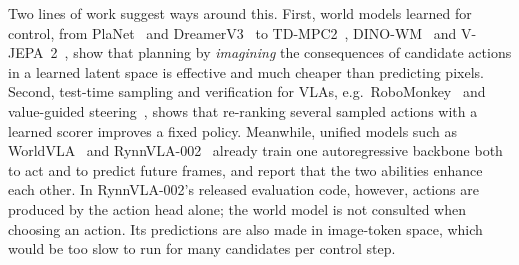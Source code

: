\documentclass[11pt]{article}
\begin{document}
Two lines of work suggest ways around this. First, world models learned for control, from PlaNet~\citep{hafner2018planet} and DreamerV3~\citep{hafner2023dreamerv3} to TD-MPC2~\citep{hansen2023tdmpc2}, DINO-WM~\citep{zhou2024dinowm} and V-JEPA~2~\citep{assran2025vjepa2}, show that planning by \emph{imagining} the consequences of candidate actions in a learned latent space is effective and much cheaper than predicting pixels. Second, test-time sampling and verification for VLAs, e.g.\ RoboMonkey~\citep{kwok2025robomonkey} and value-guided steering~\citep{nakamoto2024vgps}, shows that re-ranking several sampled actions with a learned scorer improves a fixed policy. Meanwhile, unified models such as WorldVLA~\citep{cen2025worldvla} and RynnVLA-002~\citep{cen2025rynnvla002} already train one autoregressive backbone both to act and to predict future frames, and report that the two abilities enhance each other. In RynnVLA-002's released evaluation code, however, actions are produced by the action head alone; the world model is not consulted when choosing an action. Its predictions are also made in image-token space, which would be too slow to run for many candidates per control step.
\end{document}
